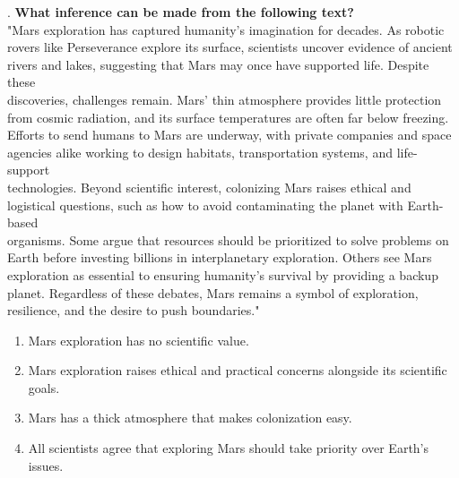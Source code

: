 \documentclass[12pt]{article}
\begin{document}
\vspace{1cm}
. \textbf{What inference can be made from the following text? }\\  
"Mars exploration has captured humanity’s imagination for decades. As robotic rovers like Perseverance explore its surface, scientists uncover evidence of ancient rivers and lakes, suggesting that Mars may once have supported life. Despite these \\discoveries, challenges remain. Mars’ thin atmosphere provides little protection from cosmic radiation, and its surface temperatures are often far below freezing. Efforts to send humans to Mars are underway, with private companies and space agencies alike working to design habitats, transportation systems, and life-support \\technologies. Beyond scientific interest, colonizing Mars raises ethical and logistical questions, such as how to avoid contaminating the planet with Earth-based \\organisms. Some argue that resources should be prioritized to solve problems on Earth before investing billions in interplanetary exploration. Others see Mars \\exploration as essential to ensuring humanity’s survival by providing a backup planet. Regardless of these debates, Mars remains a symbol of exploration, resilience, and the desire to push boundaries."  
\begin{enumerate}[label=\Alph*.]
    \item Mars exploration has no scientific value.  
    \item Mars exploration raises ethical and practical concerns alongside its scientific goals.  
    \item Mars has a thick atmosphere that makes colonization easy.  
    \item All scientists agree that exploring Mars should take priority over Earth’s issues.  
\end{enumerate}
\end{document}
